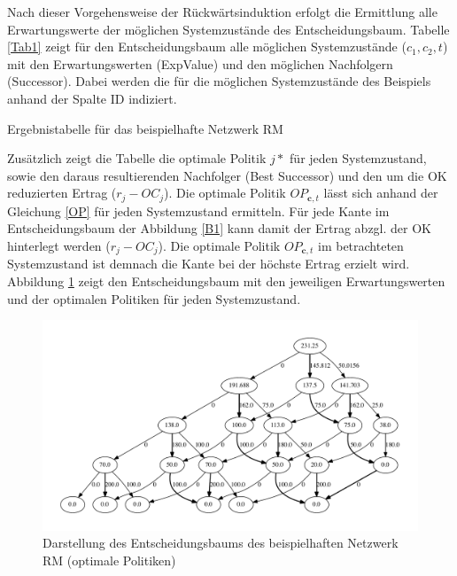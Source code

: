 Nach dieser Vorgehensweise der Rückwärtsinduktion erfolgt die Ermittlung alle Erwartungswerte der möglichen Systemzustände des Entscheidungsbaum. Tabelle \ref{Tab1} zeigt für den Entscheidungsbaum alle möglichen Systemzustände ($c_1,c_2,t$) mit den Erwartungswerten (ExpValue) und den möglichen Nachfolgern (Successor). Dabei werden die für die möglichen Systemzustände des Beispiels anhand der Spalte ID indiziert. 
\begin{table}
\begin{footnotesize}
    \caption{Ergebnistabelle für das beispielhafte Netzwerk RM} \label{Tab1}
    \vspace*{3mm}
\end{footnotesize}
\end{table}

Zusätzlich zeigt die Tabelle die optimale Politik $j*$ für jeden Systemzustand, sowie den daraus resultierenden Nachfolger (Best Successor) und den um die OK reduzierten Ertrag ($r_j-OC_j$). Die optimale Politik $OP_{\textbf{c}, t}$ lässt sich anhand der Gleichung \eqref{OP} für jeden Systemzustand ermitteln. Für jede Kante im Entscheidungsbaum der Abbildung \ref{B1} kann damit der Ertrag abzgl. der OK hinterlegt werden ($r_{j}-OC_{j}$). Die optimale Politik $OP_{\textbf{c}, t}$ im betrachteten Systemzustand ist demnach die Kante bei der höchste Ertrag erzielt wird. Abbildung \ref{B1a} zeigt den Entscheidungsbaum mit den jeweiligen Erwartungswerten und der optimalen Politiken für jeden Systemzustand.
\begin{figure}[h!]
  \begin{center}
    \includegraphics[width=150mm]{Bilder/Beispiel1a.pdf}
    \caption{Darstellung des Entscheidungsbaums des beispielhaften Netzwerk RM (optimale Politiken)}  \label{B1a}
  \end{center}
\end{figure}

